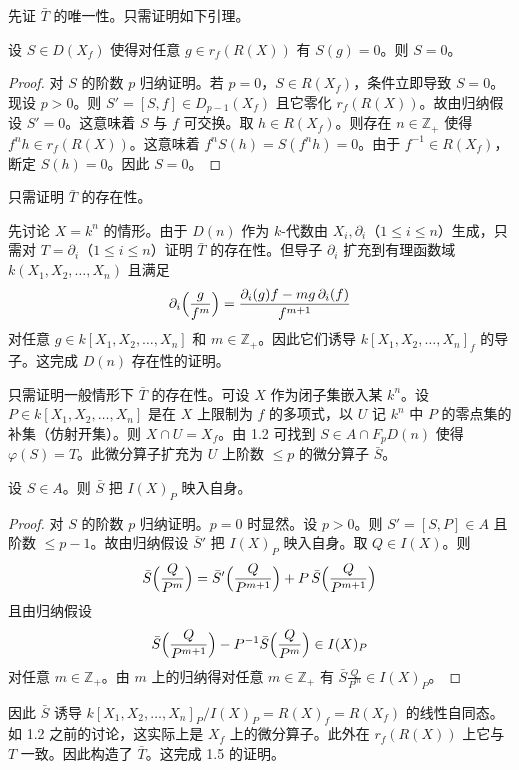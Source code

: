 先证 $\bar T$ 的唯一性。只需证明如下引理。

\begin{lemma}
设 $S\in D(X_f)$ 使得对任意 $g\in r_f(R(X))$ 有 $S(g)=0$。则 $S=0$。
\end{lemma}

\begin{proof}
对 $S$ 的阶数 $p$ 归纳证明。若 $p=0$，$S\in R(X_f)$，条件立即导致 $S=0$。现设 $p>0$。则 $S'=[S,f]\in D_{p-1}(X_f)$ 且它零化 $r_f(R(X))$。故由归纳假设 $S'=0$。这意味着 $S$ 与 $f$ 可交换。取 $h\in R(X_f)$。则存在 $n\in\mathbb{Z}_+$ 使得 $f^nh\in r_f(R(X))$。这意味着 $f^nS(h)=S(f^nh)=0$。由于 $f^{-1}\in R(X_f)$，断定 $S(h)=0$。因此 $S=0$。
\end{proof}

只需证明 $\bar T$ 的存在性。

先讨论 $X=k^n$ 的情形。由于 $D(n)$ 作为 $k$-代数由 $X_i,\partial_i$（$1\le i\le n$）生成，只需对 $T=\partial_i$（$1\le i\le n$）证明 $\bar T$ 的存在性。但导子 $\partial_i$ 扩充到有理函数域 $k(X_1,X_2,\dots,X_n)$ 且满足
$$\partial_i\Bigl(\frac{g}{f^m}\Bigr)=\frac{\partial_i(g)f-mg\,\partial_i(f)}{f^{m+1}}$$
对任意 $g\in k[X_1,X_2,\dots,X_n]$ 和 $m\in\mathbb{Z}_+$。因此它们诱导 $k[X_1,X_2,\dots,X_n]_f$ 的导子。这完成 $D(n)$ 存在性的证明。

只需证明一般情形下 $\bar T$ 的存在性。可设 $X$ 作为闭子集嵌入某 $k^n$。设 $P\in k[X_1,X_2,\dots,X_n]$ 是在 $X$ 上限制为 $f$ 的多项式，以 $U$ 记 $k^n$ 中 $P$ 的零点集的补集（仿射开集）。则 $X\cap U=X_f$。由 1.2 可找到 $S\in A\cap F_pD(n)$ 使得 $\varphi(S)=T$。此微分算子扩充为 $U$ 上阶数 $\le p$ 的微分算子 $\bar S$。

\begin{lemma}
设 $S\in A$。则 $\bar S$ 把 $I(X)_P$ 映入自身。
\end{lemma}

\begin{proof}
对 $S$ 的阶数 $p$ 归纳证明。$p=0$ 时显然。设 $p>0$。则 $S'=[S,P]\in A$ 且阶数 $\le p-1$。故由归纳假设 $\bar S'$ 把 $I(X)_P$ 映入自身。取 $Q\in I(X)$。则
$$\bar S\Bigl(\frac{Q}{P^m}\Bigr)=\bar S'\Bigl(\frac{Q}{P^{m+1}}\Bigr)+P\,\bar S\Bigl(\frac{Q}{P^{m+1}}\Bigr)$$
且由归纳假设
$$\bar S\Bigl(\frac{Q}{P^{m+1}}\Bigr)-P^{-1}\bar S\Bigl(\frac{Q}{P^{m}}\Bigr)\in I(X)_P$$
对任意 $m\in\mathbb{Z}_+$。由 $m$ 上的归纳得对任意 $m\in\mathbb{Z}_+$ 有 $\bar S\frac{Q}{P^m}\in I(X)_P$。
\end{proof}

因此 $\bar S$ 诱导 $k[X_1,X_2,\dots,X_n]_P/I(X)_P=R(X)_f=R(X_f)$ 的线性自同态。如 1.2 之前的讨论，这实际上是 $X_f$ 上的微分算子。此外在 $r_f(R(X))$ 上它与 $T$ 一致。因此构造了 $\bar T$。这完成 1.5 的证明。

